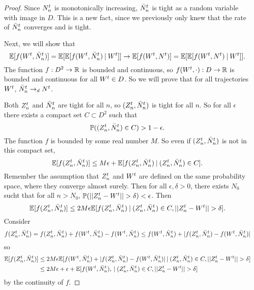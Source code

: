\begin{proof}
Since $N_n^t$ is monotonically increasing, $\bar{N}_n^t$ is tight as a random variable with image in $D$.
This is a new fact, since we previously only knew that the rate of $\bar{N}_n^t$ converges and is tight.

Next, we will show that
\begin{equation}
\mathbb{E}[f(W^t, \bar{N}_n^t)] = \mathbb{E}[ \mathbb{E}[f(W^t, \bar{N}_n^t) \: | \: W^t] ] \rightarrow \mathbb{E}[f(W^t, N^t)] = \mathbb{E}[ \mathbb{E}[f(W^t, N^t) \: | \: W^t] ].
\end{equation}
The function $f: D^2 \rightarrow \mathbb{R}$ is bounded and continuous,
so $f(W^t,\cdot): D \rightarrow \mathbb{R}$ is bounded and continuous for all $W^t \in D$.
So we will prove that for all trajectories $W^t$, $\bar{N}_n^t \rightarrow_d N^t$.

Both $Z_n^t$ and $\bar{N}_n^t$ are tight for all $n$,
so $(Z_n^t, \bar{N}_n^t)$ is tight for all $n$.
So for all $\epsilon$ there exists a compact set $C \subset D^2$ such that
\begin{equation}
\mathbb{P} ((Z_n^t, \bar{N}_n^t) \in C) > 1 - \epsilon.
\end{equation}
The function $f$ is bounded by some real number $M$.
So even if $(Z_n^t, \bar{N}_n^t)$ is not in this compact set,
\begin{equation}
\mathbb{E}[f(Z_n^t, \bar{N}_n^t)] \leq M\epsilon + \mathbb{E}[f(Z_n^t, \bar{N}_n^t) \: | \: (Z_n^t, \bar{N}_n^t) \in C].
\end{equation}
Remember the assumption that $Z_n^t$ and $W^t$ are defined on the same probability space,
where they converge almost surely.
Then for all $\epsilon, \delta > 0$, there exists $N_0$ sucht that for all $n > N_0$,  
$\Prob(||\znt - \Wt||>\delta) < \epsilon$.
Then
\begin{equation}
\Exp{f(\znt, \rnnt)} \leq 2M\epsilon \Exp{f(\znt, \rnnt) \cond (\znt, \rnnt) \in C, ||\znt - \Wt||>\delta}.
\end{equation}
Consider
\begin{equation*}
f(Z_n^t, \bar{N}_n^t) = f(Z_n^t, \bar{N}_n^t) + f(W^t, \bar{N}_n^t) - f(W^t, \bar{N}_n^t) \leq f(W^t, \bar{N}_n^t) + |f(Z_n^t, \bar{N}_n^t) - f(W^t, \bar{N}_n^t)|
\end{equation*}
so 
\begin{equation}
\begin{aligned}
\Exp{f(\znt, \rnnt)} 
&\leq 2M\epsilon \Exp{f(\Wt, \rnnt) + |f(\znt, \rnnt) - f(\Wt, \rnnt)| \cond (\znt, \rnnt) \in C, ||\znt - \Wt||>\delta } \\
&\leq 2M\epsilon + \epsilon + \Exp{f(\Wt, \rnnt), \cond (\znt, \rnnt) \in C, ||\znt - \Wt||>\delta}
\end{aligned}
\end{equation}
by the continuity of $f$.


\end{proof}
